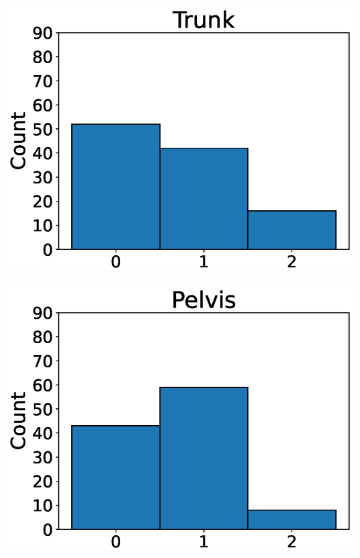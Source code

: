 \begin{figure}
  \begin{subfigure}[t]{0.24\textwidth}
    \includegraphics[width=\textwidth]{files/figs/met/trunk-test-labels.eps}
    \caption{}
    \label{fig:trunk-labels-test}
  \end{subfigure}
  \begin{subfigure}[t]{0.24\textwidth}
    \includegraphics[width=\textwidth]{files/figs/met/pelvis-test-labels.eps}
    \caption{}
    \label{fig:pelvis-labels-test}
  \end{subfigure}
  \begin{subfigure}[t]{0.24\textwidth}

\end{subfigure}
\end{figure}

